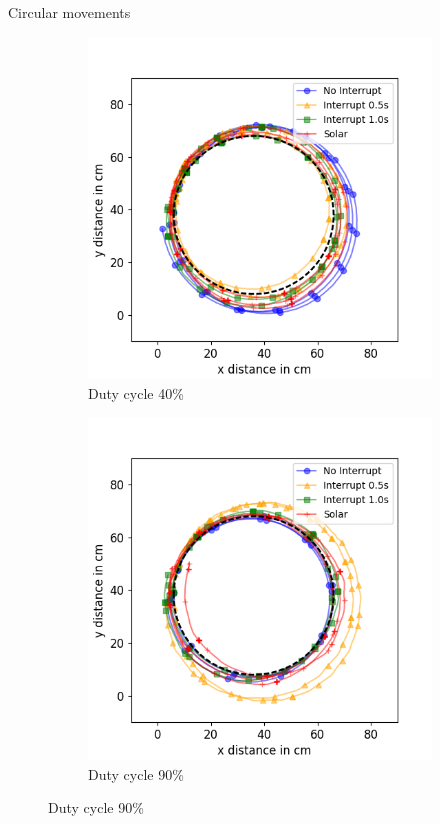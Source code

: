 \documentclass{beamer}
\begin{document}
\begin{frame}{Circular movements}
	\begin{figure}[h!]
		\centering
		\begin{subfigure}[b]{0.49\textwidth}
			\includegraphics[width=\textwidth]{pics/circle_40.png}
			\caption*{Duty cycle 40\%}
		\end{subfigure}
		\begin{subfigure}[b]{0.49\textwidth}
			\includegraphics[width=\textwidth]{pics/circle_90.png}
			\caption*{Duty cycle 90\%}
		\end{subfigure}
	\end{figure}
\end{frame}
\end{document}
